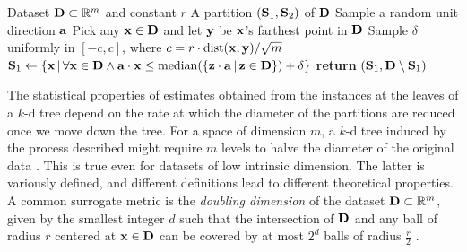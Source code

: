 \begin{algorithm}[t]
  \caption{}\label{alg:splitmax}
  \begin{algorithmic}[1]
    \Require Dataset $\mathbf{D} \subset \mathbb{R}^m$ and constant $r$
    \Ensure A partition $(\mathbf{S}_1,\mathbf{S}_2)$ of $\mathbf{D}$
    \State Sample a random unit direction $\mathbf{a}$
    \State Pick any $\mathbf{x}\in\mathbf{D}$ and let $\mathbf{y}$ be $\mathbf{x}$'s farthest point in $\mathbf{D}$
    \State Sample $\delta$ uniformly in $[-c,c]$, where ${c=r\cdot\operatorname{dist}(\mathbf{x},\mathbf{y})/\sqrt{m}}$
    \State $\mathbf{S}_1\gets\{\mathbf{x}\,|\,\forall\mathbf{x}\in\mathbf{D}\wedge\mathbf{a}\cdot\mathbf{x}\leq\operatorname{median}(\{\mathbf{z}\cdot\mathbf{a}\,|\,\mathbf{z}\in\mathbf{D}\})+\delta\}$
    \State \textbf{return} $(\mathbf{S}_1,\mathbf{D}\setminus\mathbf{S}_1)$
  \end{algorithmic}
\end{algorithm}

The statistical properties of estimates obtained from the instances at the leaves of a $k$-d tree
depend on the rate at which the diameter of the partitions are reduced once we move down the tree.
For a space of dimension $m$, a $k$-d tree induced by the process described might require $m$
levels to halve the diameter of the original data \citep{dasgupta08b}. This is true even for
datasets of low intrinsic dimension. The latter is variously defined, and different definitions
lead to different theoretical properties. A common surrogate metric is the \emph{doubling
dimension} of the dataset $\mathbf{D}\subset\mathbb{R}^m$, given by the smallest integer $d$ such that
the intersection of $\mathbf{D}$ and any ball of radius $r$ centered at $\mathbf{x}\in\mathbf{D}$ can be
covered by at most $2^d$ balls of radius $\frac{r}{2}$ \citep{dhesi10}.

